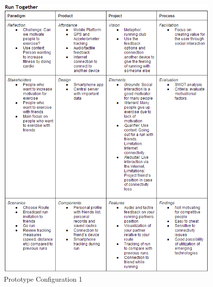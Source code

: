 \begin{figure}[ht!]
\begin{center}
 \includegraphics[width=\textwidth]{img/prototypeconfig1.png}
 \caption{Prototype Configuration 1}
 \label{fig:prototypeconfig1} 
\end{center}
\end{figure}

